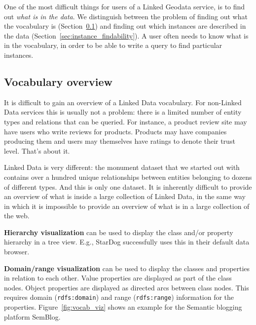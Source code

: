 \documentclass[a4paper]{scrartcl}
\newcommand{\textt}[1]{{\small \texttt{#1}}}
\begin{document}
One of the most difficult things for users of a Linked Geodata
service, is to find out \emph{what is in the data}.  We distinguish
between the problem of finding out what the vocabulary is
(Section~\ref{sec:vocabulary_overview}) and finding out which
instances are described in the data
(Section~\ref{sec:instance_findability}).  A user often needs to know
what is in the vocabulary, in order to be able to write a query to
find particular instances.


\subsection{Vocabulary overview}
\label{sec:vocabulary_overview}

It is difficult to gain an overview of a Linked Data vocabulary.  For
non-Linked Data services this is usually not a problem: there is a
limited number of entity types and relations that can be queried.  For
instance, a product review site may have users who write reviews for
products.  Products may have companies producing them and users may
themselves have ratings to denote their trust level.  That's about it.

Linked Data is very different: the monument dataset that we started
out with contains over a hundred unique relationships between entities
belonging to dozens of different types.  And this is only one dataset.
It is inherently difficult to provide an overview of what is inside a
large collection of Linked Data, in the same way in which it is
impossible to provide an overview of what is in a large collection of
the web.

\textbf{Hierarchy visualization} can be used to display the class
and/or property hierarchy in a tree view.  E.g., StarDog successfully
uses this in their default data browser.

\textbf{Domain/range visualization} can be used to display the classes
and properties in relation to each other.  Value properties are
displayed as part of the class nodes.  Object properties are displayed
as directed arcs between class nodes.  This requires domain
(\textt{rdfs:domain}) and range (\textt{rdfs:range}) information for
the properties.  Figure~\ref{fig:vocab_viz} shows an example for the
Semantic blogging platform SemBlog.
\end{document}
